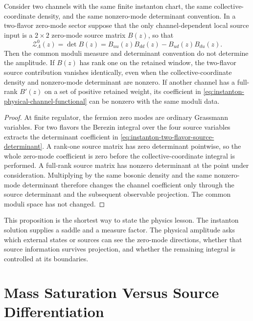 \begin{proposition}
\label{prop:instanton-moduli-equivalent-channel-separation}
Consider two channels with the same finite instanton chart, the same
collective-coordinate density, and the same nonzero-mode determinant
convention.  In a two-flavor zero-mode sector suppose that the only
channel-dependent local source input is a \(2\times2\) zero-mode source
matrix \(B(z)\), so that
\begin{equation}
  \mathcal Z_{\Lambda}^{0}(z)=
  \det B(z)
  =
  B_{uu}(z)B_{dd}(z)-B_{ud}(z)B_{du}(z).
  \label{eq:instanton-two-flavor-source-determinant}
\end{equation}
Then the common moduli measure and determinant convention do not determine
the amplitude.  If \(B(z)\) has rank one on the retained window, the
two-flavor source contribution vanishes identically, even when the
collective-coordinate density and nonzero-mode determinant are nonzero.  If
another channel has a full-rank \(B'(z)\) on a set of positive retained
weight, its coefficient in
\eqref{eq:instanton-physical-channel-functional} can be nonzero with the same
moduli data.
\end{proposition}

\begin{proof}
At finite regulator, the fermion zero modes are ordinary Grassmann variables.
For two flavors the Berezin integral over the four source variables extracts
the determinant coefficient in
\eqref{eq:instanton-two-flavor-source-determinant}.  A rank-one source matrix
has zero determinant pointwise, so the whole zero-mode coefficient is zero
before the collective-coordinate integral is performed.  A full-rank source
matrix has nonzero determinant at the point under consideration.  Multiplying
by the same bosonic density and the same nonzero-mode determinant therefore
changes the channel coefficient only through the source determinant and the
subsequent observable projection.  The common moduli space has not changed.
\end{proof}

This proposition is the shortest way to state the physics lesson.  The
instanton solution supplies a saddle and a measure factor.  The physical
amplitude asks which external states or sources can see the zero-mode
directions, whether that source information survives projection, and whether
the remaining integral is controlled at its boundaries.

\section{Mass Saturation Versus Source Differentiation}
\label{sec:instanton-mass-source-differentiation}

